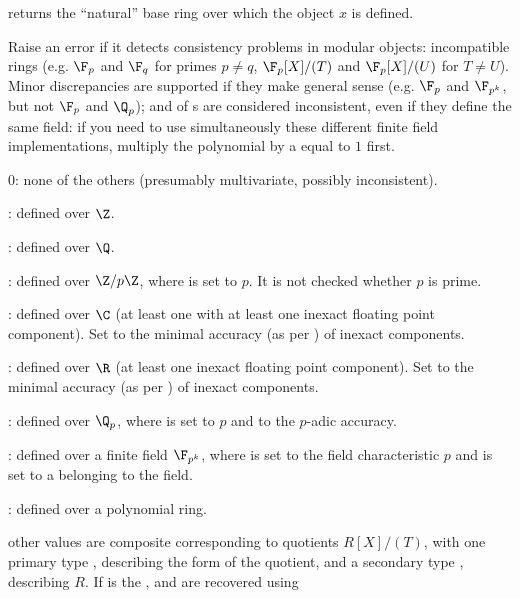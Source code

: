  returns
the ``natural'' base ring over which the object $x$ is defined.

Raise an error if it detects consistency problems in modular objects:
incompatible rings (e.g. $\F_p$ and $\F_q$ for primes $p\neq q$,
$\F_p[X]/(T)$ and $\F_p[X]/(U)$ for $T\neq U$). Minor discrepancies are
supported if they make general sense (e.g. $\F_p$ and $\F_{p^k}$, but not
$\F_p$ and $\Q_p$);  and  of s are
considered inconsistent, even if they define the same field: if you need to
use simultaneously these different finite field implementations, multiply the
polynomial by a  equal to $1$ first.

\item 0: none of the others (presumably multivariate, possibly inconsistent).

\item {}: defined over $\Z$.

\item {}: defined over $\Q$.

\item {}: defined over $\Z/p\Z$, where  is set to $p$.
It is not checked whether $p$ is prime.

\item {}: defined over $\C$ (at least one  with at
least one inexact floating point  component). Set 
to the minimal accuracy (as per ) of inexact components.

\item {}: defined over $\R$ (at least one inexact floating point
 component). Set  to the minimal accuracy (as per
) of inexact components.

\item {}: defined over $\Q_p$, where  is set to $p$ and
 to the $p$-adic accuracy.

\item {}: defined over a finite field $\F_{p^k}$, where 
is set to the field characteristic $p$ and  is set to a
 belonging to the field.

\item {}: defined over a polynomial ring.

\item other values are composite corresponding to quotients $R[X]/(T)$, with
one primary type , describing the form of the quotient,
and a secondary type , describing $R$. If  is the
,  and  are recovered using

